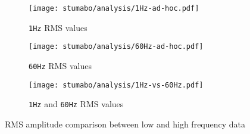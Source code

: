 \begin{figure}[htp]
    \begin{subfigure}{.495\textwidth}
        \texttt{[image: stumabo/analysis/1Hz-ad-hoc.pdf]}
        \caption{\texttt{1Hz} RMS values}
        \label{fig:stu_1Hz_rms}
    \end{subfigure}
    \begin{subfigure}{.495\textwidth}
        \texttt{[image: stumabo/analysis/60Hz-ad-hoc.pdf]}
        \caption{\texttt{60Hz} RMS values}
        \label{fig:stu_60Hz_rms}
    \end{subfigure}
    \begin{subfigure}{\textwidth}
        \texttt{[image: stumabo/analysis/1Hz-vs-60Hz.pdf]}
        \caption{\texttt{1Hz} and \texttt{60Hz} RMS values}
        \label{fig:stu_1_vs_60}
    \end{subfigure}
    \caption{RMS amplitude comparison between low and high frequency data}
    \label{fig:stu_3_rms}
\end{figure}

